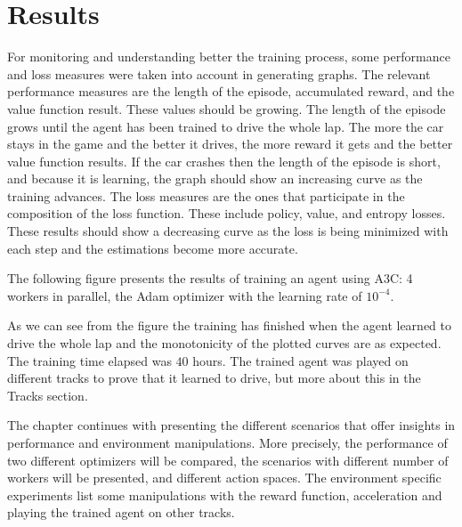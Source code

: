 \chapter{Results}
For monitoring and understanding better the training process, some performance and loss measures were taken into account in generating graphs. The relevant performance measures are the length of the episode, accumulated reward, and the value function result. These values should be growing. The length of the episode grows until the agent has been trained to drive the whole lap. The more the car stays in the game and the better it drives, the more reward it gets and the better value function results. If the car crashes then the length of the episode is short, and because it is learning, the graph should show an increasing curve as the training advances. The loss measures are the ones that participate in the composition of the loss function. These include policy, value, and entropy losses. These results should show a decreasing curve as the loss is being minimized with each step and the estimations become more accurate.

The following figure presents the results of training an agent using A3C: 4 workers in parallel, the Adam optimizer with the learning rate of $10^{-4}$. 

As we can see from the figure the training has finished when the agent learned to drive the whole lap and the monotonicity of the plotted curves are as expected. The training time elapsed was $40$ hours. The trained agent was played on different tracks to prove that it learned to drive, but more about this in the Tracks section.

The chapter continues with presenting the different scenarios that offer insights in performance and environment manipulations. More precisely, the performance of two different optimizers will be compared, the scenarios with different number of workers will be presented, and different action spaces. The environment specific experiments list some manipulations with the reward function, acceleration and playing the trained agent on other tracks.






